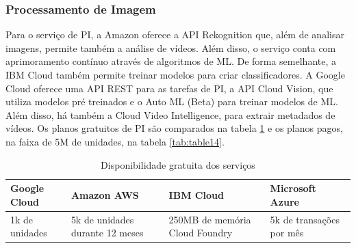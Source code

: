 \documentclass{article}
\begin{document}
\subsubsection{Processamento de Imagem}

Para o serviço de PI, a Amazon oferece a API Rekognition que, além de analisar imagens, permite também a análise de vídeos. Além disso, o serviço conta com aprimoramento contínuo através de algoritmos de ML. De forma semelhante, a IBM Cloud também permite treinar modelos para criar classificadores. A Google Cloud oferece uma API REST para as tarefas de PI, a API Cloud Vision, que utiliza modelos pré treinados e  o Auto ML (Beta) para treinar modelos de ML. Além disso, há também a Cloud Video Intelligence, para extrair metadados de vídeos. Os planos gratuitos de PI são comparados na tabela \ref{tab:table13} e os planos pagos, na faixa de 5M de unidades, na tabela \ref{tab:table14}.

\begin{table}[!!ht]
 \caption{Disponibilidade gratuita dos serviços}
  \centering
  \begin{tabular}{llll}
    \cmidrule(r){1-4}
    Google Cloud & Amazon AWS & IBM Cloud & Microsoft Azure \\
    \midrule
    1k de unidades & 5k de unidades durante 12 meses & 250MB de memória Cloud Foundry & 5k de transações por mês \\
    \bottomrule
  \end{tabular}
  \label{tab:table13}
\end{table}
\end{document}
